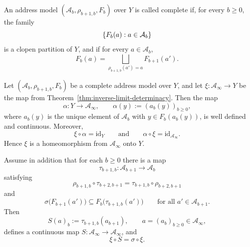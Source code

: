 \begin{definition}
\label{def:complete-address-model}
An address model \((\mathcal{A}_b,\rho_{b+1,b},F_b)\) over \(Y\) is
called complete if, for every \(b\geq 0\), the family
\[
  \left\{F_b(a):a\in\mathcal{A}_b\right\}
\]
is a clopen partition of \(Y\), and if for every \(a\in\mathcal{A}_b\),
\[
  F_b(a)
  = \bigsqcup_{\rho_{b+1,b}(a')=a} F_{b+1}(a').
\]
\end{definition}

\begin{theorem}
\label{thm:complete-address-reconstruction}
Let \((\mathcal{A}_b,\rho_{b+1,b},F_b)\) be a complete address model
over \(Y\), and let \(\xi:\mathcal{A}_\infty\to Y\) be the map from
Theorem~\ref{thm:inverse-limit-determinacy}.  Then the map
\[
  \alpha:Y\to\mathcal{A}_\infty,
  \qquad
  \alpha(y):=(a_b(y))_{b\geq 0},
\]
where \(a_b(y)\) is the unique element of \(\mathcal{A}_b\) with
\(y\in F_b(a_b(y))\), is well defined and continuous.  Moreover,
\[
  \xi\circ\alpha=\mathrm{id}_Y
  \qquad\text{and}\qquad
  \alpha\circ\xi=\mathrm{id}_{\mathcal{A}_\infty}.
\]
Hence \(\xi\) is a homeomorphism from \(\mathcal{A}_\infty\) onto \(Y\).

Assume in addition that for each \(b\geq 0\) there is a map
\[
  \tau_{b+1,b}:\mathcal{A}_{b+1}\to\mathcal{A}_b
\]
satisfying
\[
  \rho_{b+1,b}\circ\tau_{b+2,b+1}
  = \tau_{b+1,b}\circ\rho_{b+2,b+1}
\]
and
\[
  \sigma\bigl(F_{b+1}(a')\bigr)
  \subseteq F_b\bigl(\tau_{b+1,b}(a')\bigr)
  \qquad\text{for all } a'\in\mathcal{A}_{b+1}.
\]
Then
\[
  S(a)_b:=\tau_{b+1,b}(a_{b+1}),
  \qquad a=(a_b)_{b\geq 0}\in\mathcal{A}_\infty,
\]
defines a continuous map \(S:\mathcal{A}_\infty\to\mathcal{A}_\infty\),
and
\[
  \xi\circ S=\sigma\circ\xi.
\]
\end{theorem}

